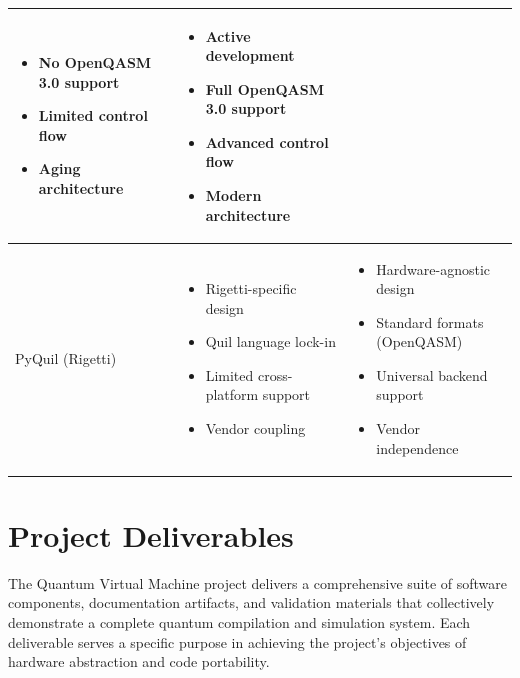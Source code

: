 \begin{table}[h!]
\begin{tabularx}{\textwidth}{|p{3cm}|X|X|}
\begin{itemize}[leftmargin=*, noitemsep, topsep=0pt]
    \item No OpenQASM 3.0 support
    \item Limited control flow
    \item Aging architecture
\end{itemize}
&
\begin{itemize}[leftmargin=*, noitemsep, topsep=0pt]
    \item Active development
    \item Full OpenQASM 3.0 support
    \item Advanced control flow
    \item Modern architecture
\end{itemize}
\\
\hline
PyQuil (Rigetti) &
\begin{itemize}[leftmargin=*, noitemsep, topsep=0pt]
    \item Rigetti-specific design
    \item Quil language lock-in
    \item Limited cross-platform support
    \item Vendor coupling
\end{itemize}
&
\begin{itemize}[leftmargin=*, noitemsep, topsep=0pt]
    \item Hardware-agnostic design
    \item Standard formats (OpenQASM)
    \item Universal backend support
    \item Vendor independence
\end{itemize}
\\
\hline

\end{tabularx}
\end{table}




\section{Project Deliverables}

The Quantum Virtual Machine project delivers a comprehensive suite of software components, documentation artifacts, and validation materials that collectively demonstrate a complete quantum compilation and simulation system. Each deliverable serves a specific purpose in achieving the project's objectives of hardware abstraction and code portability.

